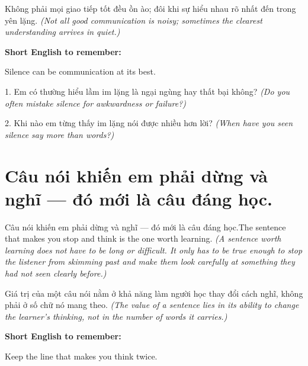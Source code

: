 \begin{baihoc}
Không phải mọi giao tiếp tốt đều ồn ào; đôi khi sự hiểu nhau rõ nhất đến trong yên lặng.
\textit{(Not all good communication is noisy; sometimes the clearest understanding arrives in quiet.)}
\end{baihoc}

\begin{ghinhoanh}
\textbf{Short English to remember:}

Silence can be communication at its best.

\end{ghinhoanh}

\begin{tuhocnhanh}
1. Em có thường hiểu lầm im lặng là ngại ngùng hay thất bại không? \textit{(Do you often mistake silence for awkwardness or failure?)}

2. Khi nào em từng thấy im lặng nói được nhiều hơn lời? \textit{(When have you seen silence say more than words?)}
\end{tuhocnhanh}
\ngancach


\section{Câu nói khiến em phải dừng và nghĩ — đó mới là câu đáng học.}
\begin{truyen}{Câu nói khiến em phải dừng và nghĩ — đó mới là câu đáng học.}{The sentence that makes you stop and think is the one worth learning.}
\textit{(A sentence worth learning does not have to be long or difficult. It only has to be true enough to stop the listener from skimming past and make them look carefully at something they had not seen clearly before.)}
\end{truyen}

\begin{baihoc}
Giá trị của một câu nói nằm ở khả năng làm người học thay đổi cách nghĩ, không phải ở số chữ nó mang theo.
\textit{(The value of a sentence lies in its ability to change the learner's thinking, not in the number of words it carries.)}
\end{baihoc}

\begin{ghinhoanh}
\textbf{Short English to remember:}

Keep the line that makes you think twice.

\end{ghinhoanh}

